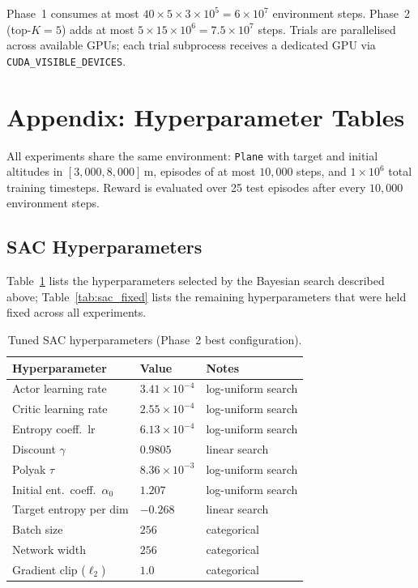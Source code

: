 Phase~1 consumes at most $40 \times 5 \times 3\times10^{5} = 6\times10^{7}$
environment steps.
Phase~2 (top-$K=5$) adds at most $5 \times 15 \times 10^{6} = 7.5\times10^{7}$
steps.
Trials are parallelised across available GPUs; each trial subprocess receives a
dedicated GPU via \texttt{CUDA\_VISIBLE\_DEVICES}.

\section*{Appendix: Hyperparameter Tables}
\label{app:hptables}

All experiments share the same environment: \texttt{Plane} with target and
initial altitudes in $[3{,}000, 8{,}000]$\,m, episodes of at most $10{,}000$
steps, and $1 \times 10^{6}$ total training timesteps.
Reward is evaluated over 25 test episodes after every $10{,}000$ environment
steps.

\subsection*{SAC Hyperparameters}

Table~\ref{tab:sac_tuned} lists the hyperparameters selected by the Bayesian
search described above; Table~\ref{tab:sac_fixed} lists the remaining
hyperparameters that were held fixed across all experiments.

\begin{table}[h]
\centering
\caption{Tuned SAC hyperparameters (Phase~2 best configuration).}
\label{tab:sac_tuned}
\begin{tabular}{lll}
\toprule
\textbf{Hyperparameter} & \textbf{Value} & \textbf{Notes} \\
\midrule
Actor learning rate       & $3.41 \times 10^{-4}$ & log-uniform search \\
Critic learning rate      & $2.55 \times 10^{-4}$ & log-uniform search \\
Entropy coeff.\ lr        & $6.13 \times 10^{-4}$ & log-uniform search \\
Discount $\gamma$         & $0.9805$               & linear search       \\
Polyak $\tau$             & $8.36 \times 10^{-3}$ & log-uniform search  \\
Initial ent.\ coeff.\ $\alpha_0$ & $1.207$         & log-uniform search  \\
Target entropy per dim    & $-0.268$               & linear search       \\
Batch size                & $256$                  & categorical         \\
Network width             & $256$                  & categorical         \\
Gradient clip ($\ell_2$)  & $1.0$                  & categorical         \\
\bottomrule
\end{tabular}
\end{table}


